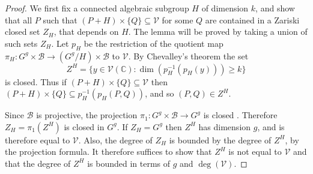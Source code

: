 \documentclass[12pt, reqno]{amsart}
\newcommand{\C}{\mathbb{C}}
\theoremstyle{remark}
\theoremstyle{definition}
\numberwithin{equation}{section}
\begin{document}
\begin{proof} 
We first fix a connected algebraic subgroup $H$ of dimension $k$, and show that all $P$ such that $(P + H) \times \{Q\} \subseteq \mathcal{V}$ for some $Q$ are contained in a Zariski closed set $Z_H$, that depends on $H$. The lemma will be proved by taking a union of such sets $Z_H$. Let $p_H$ be the restriction of the quotient map $\pi_H : G^g \times \mathcal{B} \to (G^g/H) \times \mathcal{B}$ to $\mathcal{V}$. By Chevalley's theorem \cite[Theorem 1.3.1]{EGAIV} the set 
$$Z^H = \{y \in \mathcal{V}(\C) :  \dim(p_H^{-1}(p_H(y))) \geq k \}$$
is closed. Thus if $(P + H) \times \{Q\} \subseteq \mathcal{V}$ then $(P + H) \times \{Q\} \subseteq p_H^{-1}(p_H(P, Q))$, and so $(P, Q) \in Z^H$. 

Since $\mathcal{B}$ is projective, the projection $\pi_1 : G^g \times \mathcal{B} \to G^g$ is closed \cite[Theorem 1.11]{Shafarevic}. Therefore $Z_H = \pi_1(Z^H)$ is closed in $G^g$. If $Z_H = G^g$ then $Z^H$ has dimension $g$, and is therefore equal to $\mathcal{V}$. Also, the degree of $Z_H$ is bounded by the degree of $Z^H$, by the projection formula. It therefore suffices to show that $Z^H$ is not equal to $\mathcal{V}$ and that the degree of $Z^H$ is bounded in terms of $g$ and $\deg(\mathcal{V})$.


\end{proof}
\end{document}
